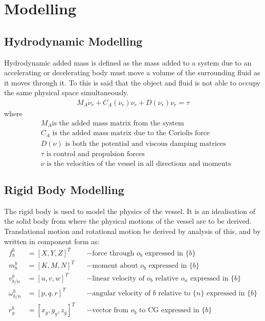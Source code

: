 \chapter{Modelling}

\section{Hydrodynamic Modelling}
Hydrodynamic added mass is defined as the mass added to a system due to an accelerating or decelerating body must move a volume of the surrounding fluid as it moves through it. To this is said that the object and fluid is not able to occupy the same physical space simultaneously.
\begin{align}
M_A \dot \nu_r + C_A(\nu_r)\nu_r + D(\nu_r)\nu_r = \tau
\label{eq:hydmodel}
\end{align}
where
\begin{align}
&M_A \text{is the added mass matrix from the system}\nonumber\\
&C_A \text{ is the added mass matrix due to the Coriolis force}\nonumber\\
&D(\nu) \text{ is both the potential and viscous damping matrices}\nonumber\\
&\tau \text{ is control and propulsion forces}\nonumber\\
&\nu \text{ is the velocities of the vessel in all directions and moments}
\end{align}

\section{Rigid Body Modelling}
The rigid body is used to model the physics of the vessel. It is an idealisation of the solid body from where the physical motions of the vessel are to be derived. Translational motion and rotational motion be derived by analysis of this, and by \citep{fossen} written in component form as:
\begin{align}
f^b_b &= [X,Y,Z]^T & &- \text{force through } o_b \text{ expressed in } \{b\}\\
m^b_b &= [K,M,N]^T & &- \text{moment about } o_b \text{ expressed in } \{b\}\\
v^b_{b/n} &= [u,v,w]^T & &- \text{linear velocity of } o_b \text{ relative } o_n \text{ expressed in } \{b\}\\
\omega^b_{b/n} &= [p,q,r]^T & &- \text{angular velocity of } {b} \text{ relative to } \{n\} \text{ expressed in } \{b\}\\
r^b_g &= [x_g,y_g,z_g]^T & &- \text{vector from } o_b \text{ to CG expressed in } \{b\}
\end{align}

